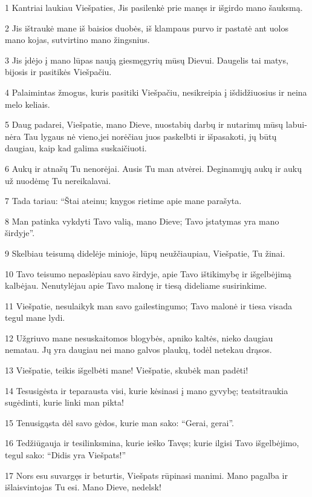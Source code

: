 \par 1 Kantriai laukiau Viešpaties, Jis pasilenkė prie manęs ir išgirdo mano šauksmą. 
\par 2 Jis ištraukė mane iš baisios duobės, iš klampaus purvo ir pastatė ant uolos mano kojas, sutvirtino mano žingsnius. 
\par 3 Jis įdėjo į mano lūpas naują giesmę­gyrių mūsų Dievui. Daugelis tai matys, bijosis ir pasitikės Viešpačiu. 
\par 4 Palaimintas žmogus, kuris pasitiki Viešpačiu, nesikreipia į išdidžiuosius ir neina melo keliais. 
\par 5 Daug padarei, Viešpatie, mano Dieve, nuostabių darbų ir nutarimų mūsų labui­nėra Tau lygaus nė vieno,­jei norėčiau juos paskelbti ir išpasakoti, jų būtų daugiau, kaip kad galima suskaičiuoti. 
\par 6 Aukų ir atnašų Tu nenorėjai. Ausis Tu man atvėrei. Deginamųjų aukų ir aukų už nuodėmę Tu nereikalavai. 
\par 7 Tada tariau: “Štai ateinu; knygos rietime apie mane parašyta. 
\par 8 Man patinka vykdyti Tavo valią, mano Dieve; Tavo įstatymas yra mano širdyje”. 
\par 9 Skelbiau teisumą didelėje minioje, lūpų neužčiaupiau, Viešpatie, Tu žinai. 
\par 10 Tavo teisumo nepaslėpiau savo širdyje, apie Tavo ištikimybę ir išgelbėjimą kalbėjau. Nenutylėjau apie Tavo malonę ir tiesą dideliame susirinkime. 
\par 11 Viešpatie, nesulaikyk man savo gailestingumo; Tavo malonė ir tiesa visada tegul mane lydi. 
\par 12 Užgriuvo mane nesuskaitomos blogybės, apniko kaltės, nieko daugiau nematau. Jų yra daugiau nei mano galvos plaukų, todėl netekau drąsos. 
\par 13 Viešpatie, teikis išgelbėti mane! Viešpatie, skubėk man padėti! 
\par 14 Tesusigėsta ir teparausta visi, kurie kėsinasi į mano gyvybę; teatsitraukia sugėdinti, kurie linki man pikta! 
\par 15 Tenusigąsta dėl savo gėdos, kurie man sako: “Gerai, gerai”. 
\par 16 Tedžiūgauja ir tesilinksmina, kurie ieško Tavęs; kurie ilgisi Tavo išgelbėjimo, tegul sako: “Didis yra Viešpats!” 
\par 17 Nors esu suvargęs ir beturtis, Viešpats rūpinasi manimi. Mano pagalba ir išlaisvintojas Tu esi. Mano Dieve, nedelsk!



